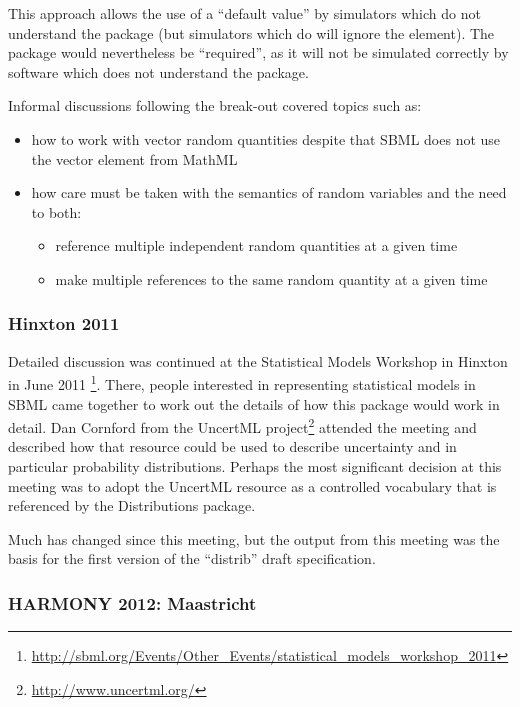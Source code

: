 \documentclass[draftspec]{sbmlpkgspec}
\newcommand{\distrib}{Distributions\xspace}
\newcommand{\uncertml}{UncertML\xspace}
\begin{document}
This approach allows the use of a ``default value'' by simulators which do not
understand the package (but simulators which do will ignore the 
element). The package would nevertheless be ``required'', as it will not
be simulated correctly by software which does not understand the
package.

Informal discussions following the break-out covered topics such as:

\begin{itemize}
\item how to work with vector random quantities despite that SBML does not use the vector element from MathML
\item how care must be taken with the semantics of random variables
  and the need to both:
\begin{itemize}
\item reference multiple independent random quantities at a given
  time
\item make multiple references to the same random quantity at a given
time
\end{itemize}
\end{itemize}

\subsubsection{Hinxton 2011}

Detailed discussion was continued at the Statistical Models Workshop
in Hinxton in June 2011%
\footnote{\url{http://sbml.org/Events/Other_Events/statistical_models_workshop_2011}}. There,
people interested in representing statistical models in SBML came
together to work out the details of how this package would work in
detail. Dan Cornford from the \uncertml
project\footnote{\url{http://www.uncertml.org/}} attended the meeting
and described how that resource could be used to describe uncertainty
and in particular probability distributions. Perhaps the most
significant decision at this meeting was to adopt the \uncertml
resource as a controlled vocabulary that is referenced by the \distrib package.

Much has changed since this meeting, but the output from this meeting
was the basis for the first version of the ``distrib'' draft specification.


\subsubsection{HARMONY 2012: Maastricht}
\end{document}
